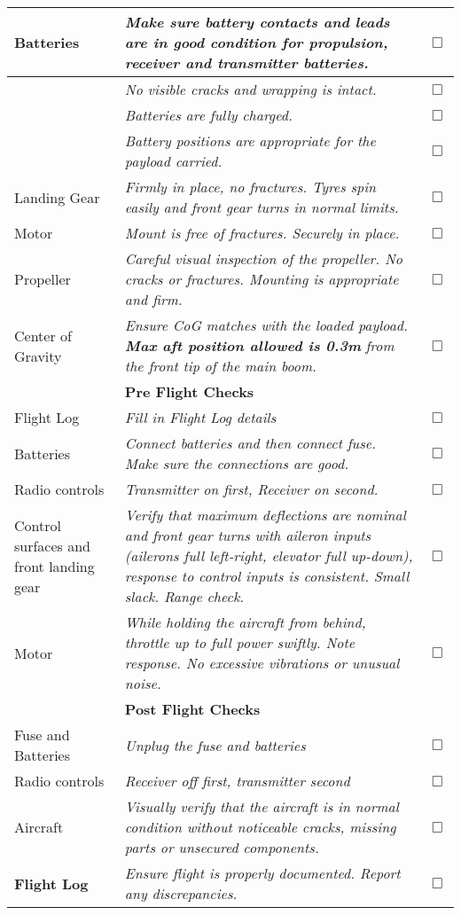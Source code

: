 \begin{center}
\begin{tabular}{p{}p{}p{}}
\hline Batteries & \textit{Make sure battery contacts and leads are in good condition for propulsion, receiver and transmitter batteries. } & 
 $\Box$ \\
\hline
 & \textit{No visible cracks and wrapping is intact.} &  $\Box$ \\
\hline
 & \textit{Batteries are fully charged. } &  $\Box$ \\
\hline
 & \textit{Battery positions are appropriate for the payload carried.} 
&  $\Box$ \\
\hline
Landing Gear & \textit{Firmly in place, no fractures. Tyres spin easily 
and front gear turns in normal limits.} &  $\Box$ \\
\hline
Motor & \textit{Mount is free of fractures. Securely in place.} & 
 $\Box$ \\
\hline
Propeller & \textit{Careful visual inspection of the propeller. No 
cracks or fractures. Mounting is appropriate and firm. } &  $\Box$
\\
\hline
Center of Gravity & \textit{Ensure CoG matches with the loaded payload. 
}\textbf{\textit{Max aft position allowed is 0.3m}}\textit{ from 
the front tip of the main boom.} &  $\Box$ \\
\hline
& \textbf{Pre Flight Checks}& \\
\hline
Flight Log & \textit{Fill in Flight Log details} &  $\Box$ \\
\hline
Batteries & \textit{Connect batteries and then connect fuse. Make sure 
the connections are good.} &  $\Box$ \\
\hline
Radio controls & \textit{Transmitter on first, Receiver on second.} & 
 $\Box$ \\
\hline
Control surfaces and front landing gear & \textit{Verify that maximum 
deflections are nominal and front gear turns with aileron inputs 
(ailerons full left-right, elevator full up-down), response to control 
inputs is consistent. Small slack. Range check.} &  $\Box$ \\
\hline
Motor & \textit{While holding the aircraft from behind, throttle up to 
full power swiftly. Note response. No excessive vibrations or unusual 
noise.} &  $\Box$ \\
\hline
& \textbf{Post Flight Checks} &\\
\hline
Fuse and Batteries & \textit{Unplug the fuse and batteries} &  $\Box$ \\
\hline
Radio controls & \textit{Receiver off first, transmitter second} & 
 $\Box$ \\
\hline
Aircraft & \textit{Visually verify that the aircraft is in normal 
condition without noticeable cracks, missing parts or unsecured 
components.} &  $\Box$ \\
\hline
\textbf{Flight Log} & \textit{Ensure flight is properly documented. Report any 
discrepancies.} &  $\Box$ \\
\hline
\end{tabular}
\end{center}